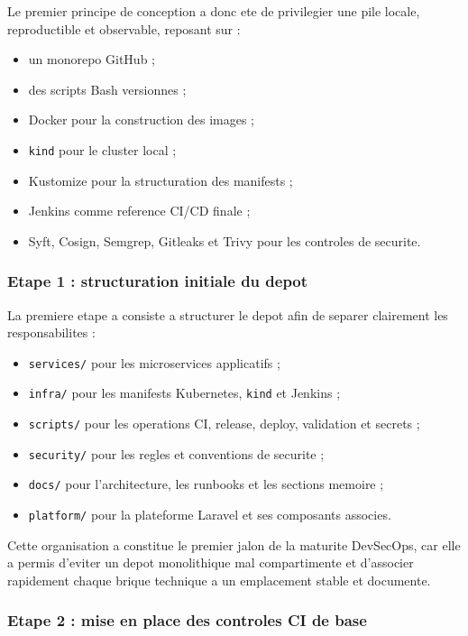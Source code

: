 Le premier principe de conception a donc ete de privilegier une pile locale, reproductible et observable, reposant sur :

\begin{itemize}
  \item un monorepo GitHub ;
  \item des scripts Bash versionnes ;
  \item Docker pour la construction des images ;
  \item \texttt{kind} pour le cluster local ;
  \item Kustomize pour la structuration des manifests ;
  \item Jenkins comme reference CI/CD finale ;
  \item Syft, Cosign, Semgrep, Gitleaks et Trivy pour les controles de securite.
\end{itemize}

\subsubsection{Etape 1 : structuration initiale du depot}

La premiere etape a consiste a structurer le depot afin de separer clairement les responsabilites :

\begin{itemize}
  \item \texttt{services/} pour les microservices applicatifs ;
  \item \texttt{infra/} pour les manifests Kubernetes, \texttt{kind} et Jenkins ;
  \item \texttt{scripts/} pour les operations CI, release, deploy, validation et secrets ;
  \item \texttt{security/} pour les regles et conventions de securite ;
  \item \texttt{docs/} pour l'architecture, les runbooks et les sections memoire ;
  \item \texttt{platform/} pour la plateforme Laravel et ses composants associes.
\end{itemize}

Cette organisation a constitue le premier jalon de la maturite DevSecOps, car elle a permis d'eviter un depot monolithique mal compartimente et d'associer rapidement chaque brique technique a un emplacement stable et documente.

\subsubsection{Etape 2 : mise en place des controles CI de base}

